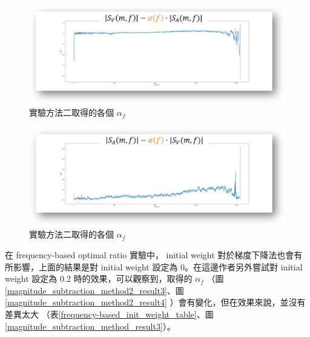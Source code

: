 \begin{figure}[htbp]
    \hfil
    \begin{minipage}[t]{0.6\textwidth}
        \includegraphics[width=\textwidth]{./figures/chapter05_result/spectrogram_subtraction_nn_accompaniment-vocals_T-216.png}
        \caption {實驗方法二取得的各個 $\alpha_f$}
        \label{magnitude_subtraction_method2_result1}
    \end{minipage}
    \hfil
\end{figure}
\begin{figure}[htbp]
    \hfil
    \begin{minipage}[t]{0.6\textwidth}
        \includegraphics[width=\textwidth]{./figures/chapter05_result/spectrogram_subtraction_nn_vocals-accompaniment_T-216.png}
        \caption {實驗方法二取得的各個 $\alpha_f$}
        \label{magnitude_subtraction_method2_result2}
    \end{minipage}
    \hfil
\end{figure}

在 frequency-based optimal ratio 實驗中， initial weight 對於梯度下降法也會有所影響，上面的結果是對 initial weight 設定為 0。在這邊作者另外嘗試對 initial weight 設定為 0.2 時的效果，可以觀察到，取得的 $\alpha_f$ （圖\ref{magnitude_subtraction_method2_result3}、圖\ref{magnitude_subtraction_method2_result4} ）會有變化，但在效果來說，並沒有差異太大 （表\ref{frequency-based_init_weight_table}、圖\ref{magnitude_subtraction_method_result3}）。

